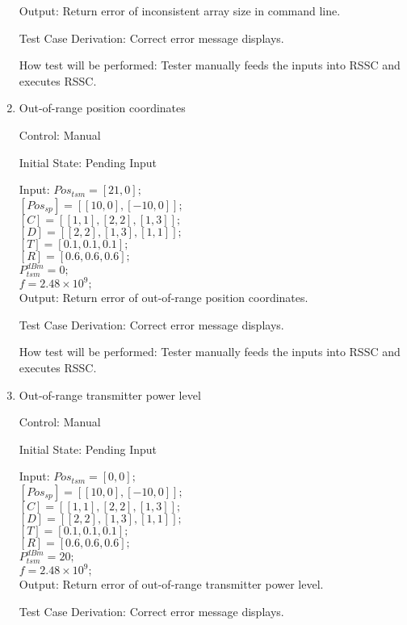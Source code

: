 \documentclass[12pt, titlepage]{article}
\begin{document}
\begin{enumerate}
Output: Return error of inconsistent array size in command line.

Test Case Derivation: Correct error message displays.

How test will be performed: Tester manually feeds the inputs into
RSSC and executes RSSC.


\item{Out-of-range position coordinates\\}

Control: Manual
					
Initial State: Pending Input
					
Input:
$Pos_{tsm} = [21,0];$\\
$[Pos_{sp}] = [[10,0],[-10,0]];$\\
$[C] = [[1,1],[2,2],[1,3]];$\\
$[D] = [[2,2],[1,3],[1,1]];$\\
$[T] = [0.1,0.1,0.1];$\\
$[R] = [0.6,0.6,0.6];$\\
$P_{tsm}^{dBm} = 0;$\\
$f = 2.48\times10^{9};$\\

Output: Return error of out-of-range position coordinates.

Test Case Derivation: Correct error message displays.
					
How test will be performed: Tester manually feeds the inputs into
RSSC and executes RSSC.


\item{Out-of-range transmitter power level\\}

Control: Manual
					
Initial State: Pending Input
					
Input:
$Pos_{tsm} = [0,0];$\\
$[Pos_{sp}] = [[10,0],[-10,0]];$\\
$[C] = [[1,1],[2,2],[1,3]];$\\
$[D] = [[2,2],[1,3],[1,1]];$\\
$[T] = [0.1,0.1,0.1];$\\
$[R] = [0.6,0.6,0.6];$\\
$P_{tsm}^{dBm} = 20;$\\
$f = 2.48\times10^{9};$\\

Output: Return error of out-of-range transmitter power level.

Test Case Derivation: Correct error message displays.
					

\end{enumerate}
\end{document}
